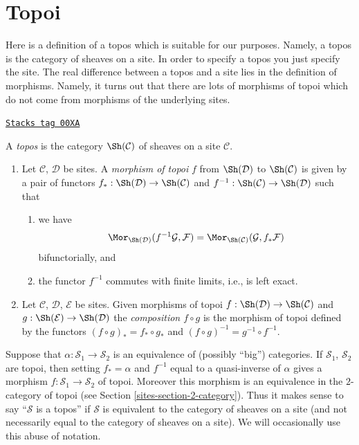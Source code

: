 \section{Topoi}
\label{sites-section-topoi}
Here is a definition of a topos which is suitable for our purposes.
Namely, a topos is the category of sheaves on a site. In order to specify
a topos you just specify the site. The real difference between a topos
and a site lies in the definition of morphisms. Namely, it turns out that
there are lots of morphisms of topoi which do not come from morphisms
of the underlying sites.

\begin{definition}[Topoi]

\label{sites-definition-topos}
\href{https://stacks.math.columbia.edu/tag/00XA}{\texttt{Stacks tag 00XA}}

A {\it topos} is the category $\Sh(\mathcal{C})$ of sheaves
on a site $\mathcal{C}$.
\begin{enumerate}
\item Let $\mathcal{C}$, $\mathcal{D}$ be sites.
A {\it morphism of topoi} $f$ from $\Sh(\mathcal{D})$
to $\Sh(\mathcal{C})$ is given by a pair of functors
$f_* : \Sh(\mathcal{D}) \to \Sh(\mathcal{C})$
and
$f^{-1} : \Sh(\mathcal{C}) \to \Sh(\mathcal{D})$
such that
\begin{enumerate}
\item we have
$$
\Mor_{\Sh(\mathcal{D})}(f^{-1}\mathcal{G}, \mathcal{F})
=
\Mor_{\Sh(\mathcal{C})}(\mathcal{G}, f_*\mathcal{F})
$$
bifunctorially, and
\item the functor $f^{-1}$ commutes with finite limits, i.e.,
is left exact.
\end{enumerate}
\item Let $\mathcal{C}$, $\mathcal{D}$, $\mathcal{E}$ be sites.
Given morphisms of topoi
$f :\Sh(\mathcal{D}) \to \Sh(\mathcal{C})$ and
$g :\Sh(\mathcal{E}) \to \Sh(\mathcal{D})$ the
{\it composition $f\circ g$} is the morphism of topoi defined
by the functors
$(f \circ g)_* = f_* \circ g_*$ and
$(f \circ g)^{-1} = g^{-1} \circ f^{-1}$.
\end{enumerate}
\end{definition}

Suppose that $\alpha : \mathcal{S}_1 \to \mathcal{S}_2$ is an equivalence of
(possibly ``big'') categories. If $\mathcal{S}_1$, $\mathcal{S}_2$
are topoi, then setting $f_* = \alpha$ and $f^{-1}$ equal to a quasi-inverse
of $\alpha$ gives a morphism $f : \mathcal{S}_1 \to \mathcal{S}_2$ of topoi.
Moreover this morphism is an equivalence in the $2$-category of topoi (see
Section \ref{sites-section-2-category}).
Thus it makes sense to say ``$\mathcal{S}$ is a topos'' if $\mathcal{S}$
is equivalent to the category of sheaves on a site (and not necessarily
equal to the category of sheaves on a site). We will occasionally
use this abuse of notation.

